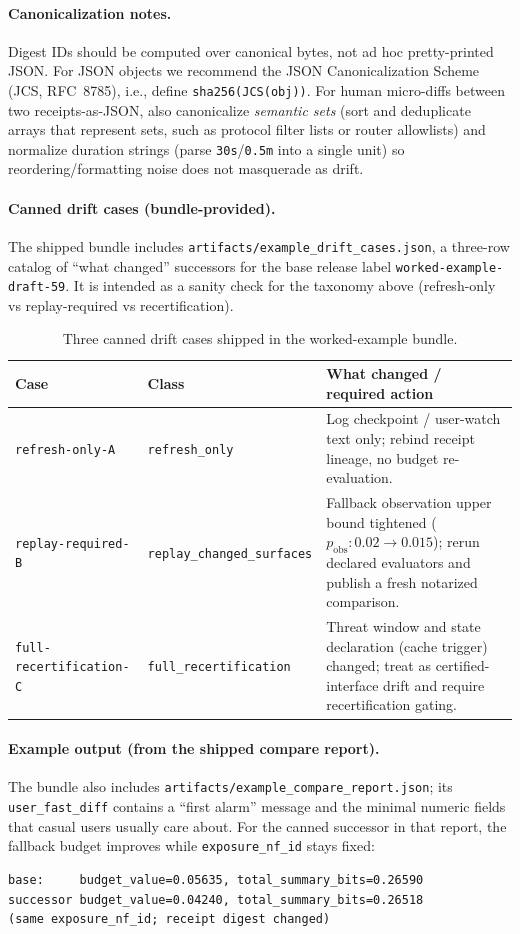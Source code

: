\documentclass[11pt]{article}
\begin{document}
\paragraph{Canonicalization notes.}
Digest IDs should be computed over canonical bytes, not ad hoc pretty-printed JSON.
For JSON objects we recommend the JSON Canonicalization Scheme (JCS, RFC~8785), i.e., define \texttt{sha256(JCS(obj))}.\cite{rfc8785}
For human micro-diffs between two receipts-as-JSON, also canonicalize \emph{semantic sets} (sort and deduplicate arrays that represent sets, such as protocol filter lists or router allowlists) and normalize duration strings (parse \texttt{30s}/\texttt{0.5m} into a single unit) so reordering/formatting noise does not masquerade as drift.

\paragraph{Canned drift cases (bundle-provided).}
The shipped bundle includes \texttt{artifacts/example\_drift\_cases.json}, a three-row catalog of ``what changed'' successors for the base release label \texttt{worked-example-draft-59}. It is intended as a sanity check for the taxonomy above (refresh-only vs replay-required vs recertification).
\begin{table}[t]
\centering
\begin{tabularx}{\linewidth}{@{}l l X@{}}
\toprule
Case & Class & What changed / required action \\
\midrule
\texttt{refresh-only-A} & \texttt{refresh\_only} & Log checkpoint / user-watch text only; rebind receipt lineage, no budget re-evaluation. \\
\texttt{replay-required-B} & \texttt{replay\_changed\_surfaces} & Fallback observation upper bound tightened ($p_{\mathrm{obs}}:0.02\to0.015$); rerun declared evaluators and publish a fresh notarized comparison. \\
\texttt{full-recertification-C} & \texttt{full\_recertification} & Threat window and state declaration (cache trigger) changed; treat as certified-interface drift and require recertification gating. \\
\bottomrule
\end{tabularx}
\caption{Three canned drift cases shipped in the worked-example bundle.}\label{tab:workedexample-driftcases}
\end{table}

\paragraph{Example output (from the shipped compare report).}
The bundle also includes \texttt{artifacts/example\_compare\_report.json}; its \texttt{user\_fast\_diff} contains a ``first alarm'' message and the minimal numeric fields that casual users usually care about. For the canned successor in that report, the fallback budget improves while \texttt{exposure\_nf\_id} stays fixed:
\begin{verbatim}
base:     budget_value=0.05635, total_summary_bits=0.26590
successor budget_value=0.04240, total_summary_bits=0.26518
(same exposure_nf_id; receipt digest changed)
\end{verbatim}
\end{document}
